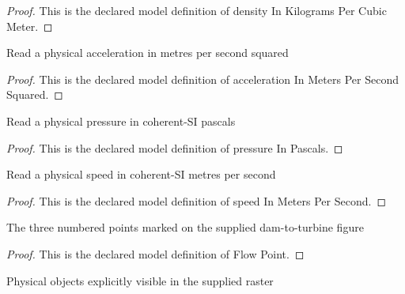 \begin{proof}
  This is the declared model definition of density In Kilograms Per Cubic Meter.
\end{proof}
\begin{definition}
  \label{def:physics:phyx-mini-0725:phyxminiproblems-problemphyxmini0725-accelerationinmeterspersecondsquared}
  Read a physical acceleration in metres per second squared
\end{definition}
\begin{proof}
  This is the declared model definition of acceleration In Meters Per Second Squared.
\end{proof}
\begin{definition}
  \label{def:physics:phyx-mini-0725:phyxminiproblems-problemphyxmini0725-pressureinpascals}
  Read a physical pressure in coherent-SI pascals
\end{definition}
\begin{proof}
  This is the declared model definition of pressure In Pascals.
\end{proof}
\begin{definition}
  \label{def:physics:phyx-mini-0725:phyxminiproblems-problemphyxmini0725-speedinmeterspersecond}
  Read a physical speed in coherent-SI metres per second
\end{definition}
\begin{proof}
  This is the declared model definition of speed In Meters Per Second.
\end{proof}
\begin{definition}
  \label{def:physics:phyx-mini-0725:phyxminiproblems-problemphyxmini0725-flowpoint}
  The three numbered points marked on the supplied dam-to-turbine figure
\end{definition}
\begin{proof}
  This is the declared model definition of Flow Point.
\end{proof}
\begin{definition}
  \label{def:physics:phyx-mini-0725:phyxminiproblems-problemphyxmini0725-figureobject}
  Physical objects explicitly visible in the supplied raster
\end{definition}
